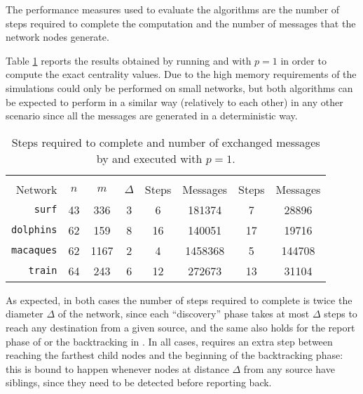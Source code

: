 The performance measures used to evaluate the algorithms are the number of steps required to complete the computation and the number of messages that the network nodes generate.

Table \ref{table:comparison} reports the results obtained by running \deccen{} and \multibfs{} with $p = 1$ in order to compute the exact centrality values. Due to the high memory requirements of \deccen{} the simulations could only be performed on small networks, but both algorithms can be expected to perform in a similar way (relatively to each other) in any other scenario since all the messages are generated in a deterministic way.

\begin{table}
\centering

\begin{tabular}{r c c c c c c c}
\toprule
 & & & & \multicolumn{2}{c}{\deccen{}} & \multicolumn{2}{c}{\multibfs{}} \\ \cmidrule(lr){5-6} \cmidrule(lr){7-8} 

Network           & $n$ & $m$  & $\Delta$ & Steps  & Messages & Steps & Messages \\ \midrule

\texttt{surf}     & 43  & 336  & 3        & 6      & 181374  & 7     & 28896 \\
\texttt{dolphins} & 62  & 159  & 8        & 16     & 140051   & 17    & 19716 \\
\texttt{macaques}  & 62  & 1167 & 2        & 4      & 1458368  & 5     & 144708 \\
\texttt{train}    & 64  & 243  & 6        & 12     & 272673  & 13    & 31104 \\
 
\bottomrule

\end{tabular}

\caption{Steps required to complete and number of exchanged messages by \deccen{} and \multibfs{} executed with $p=1$.}

\label{table:comparison}

\end{table}

As expected, in both cases the number of steps required to complete is twice the diameter $\Delta$ of the network, since each ``discovery'' phase takes at most $\Delta$ steps to reach any destination from a given source, and the same also holds for the report phase of \deccen{} or the backtracking in \multibfs{}. In all cases, \multibfs{} requires an extra step between reaching the farthest child nodes and the beginning of the backtracking phase: this is bound to happen whenever nodes at distance $\Delta$ from any source have siblings, since they need to be detected before reporting back.


